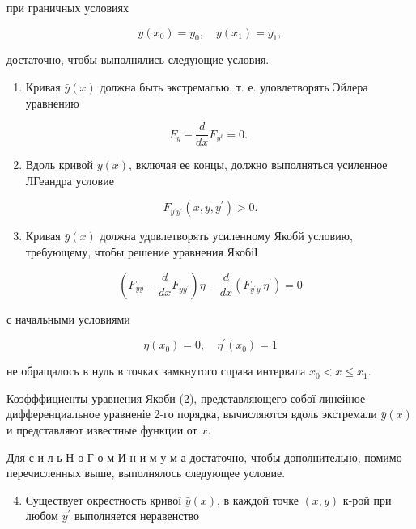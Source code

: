 \documentclass[10pt]{article}
\begin{document}
при граничных условиях

\[
y\left(x_{0}\right)=y_{0}, \quad y\left(x_{1}\right)=y_{1},
\]

достаточно, чтобы выполнялись следующие условия.

\begin{enumerate}
  \item Кривая $\bar{y}(x)$ должна быть экстремалью, т. е. удовлетворять Эйлера уравнению
\end{enumerate}

\[
F_{y}-\frac{d}{d x} F_{y^{\ell}}=0 \text {. }
\]

\begin{enumerate}
  \setcounter{enumi}{1}
  \item Вдоль кривой $\bar{y}(x)$, включая ее концы, должно выполняться усиленное ЛГеандра условие
\end{enumerate}

\[
F_{y^{\prime} y^{\prime}}\left(x, y, y^{\prime}\right)>0 .
\]

\begin{enumerate}
  \setcounter{enumi}{2}
  \item Кривая $\bar{y}(x)$ должна удовлетворять усиленному Якобй условию, требующему, чтобы решение уравнения ЯкобіІ
\end{enumerate}

\[
\left(F_{y y}-\frac{d}{d x} F_{y y^{\prime}}\right) \eta-\frac{d}{d x}\left(F_{y^{\prime} y^{\prime}} \eta^{\prime}\right)=0
\]

с начальными условиями

\[
\eta\left(x_{0}\right)=0, \quad \eta^{\prime}\left(x_{0}\right)=1
\]

не обращалось в нуль в точках замкнутого справа интервала $x_{0}<x \leqslant x_{1}$.

Коэфффициенты уравнения Якоби (2), представляющего собої линейное дифференциальное уравненіе 2-го порядка, вычисляются вдоль экстремали $\bar{y}(x)$ и представляют известные функции от $x$.

Для с и л ь Н о Г о м И н и м у м а достаточно, чтобы дополнительно, помимо перечисленных выше, выполнялось следующее условие.

\begin{enumerate}
  \setcounter{enumi}{3}
  \item Существует окрестность кривої $\bar{y}(x)$, в каждой точке $(x, y)$ к-рой при любом $y^{\prime}$ выполняется неравенство
\end{enumerate}
\end{document}
